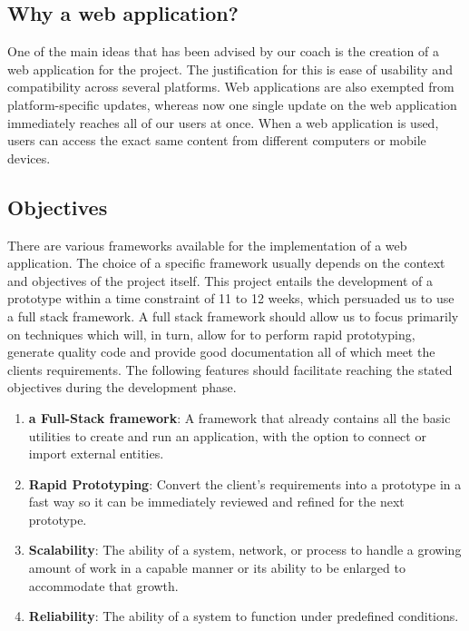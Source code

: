 \subsection{Why a web application?}
One of the main ideas that has been advised by our coach is the creation of a web application for the project. The justification for this is ease of usability and compatibility across several platforms. Web applications are also exempted from platform-specific updates, whereas now one single update on the web application immediately reaches all of our users at once. When a web application is used, users can access the exact same content from different computers or mobile devices.
\subsection{Objectives}
There are various frameworks available for the implementation of a web application. The choice of a specific framework usually depends on the context and objectives of the project itself. This project entails the development of a prototype within a time constraint of 11 to 12 weeks, which persuaded us to use a full stack framework. A full stack framework should allow us to focus primarily on techniques which will, in turn, allow for to perform rapid prototyping, generate quality code and provide good documentation all of which meet the clients requirements. The following features should facilitate reaching the stated objectives during the development phase.

\begin{enumerate}
	\item \textbf{a Full-Stack framework}: A framework that already contains all the basic utilities to create and run an application, with the option to connect or import external entities.
	\item \textbf{Rapid Prototyping}: Convert the client's requirements into a prototype in a fast way so it can be immediately reviewed and refined for the next prototype.
	\item \textbf{Scalability}: The ability of a system, network, or process to handle a growing amount of work in a capable manner or its ability to be enlarged to accommodate that growth.\cite{wiki:scalability}
	\item \textbf{Reliability}: The ability of a system to function under predefined conditions.
\end{enumerate}

